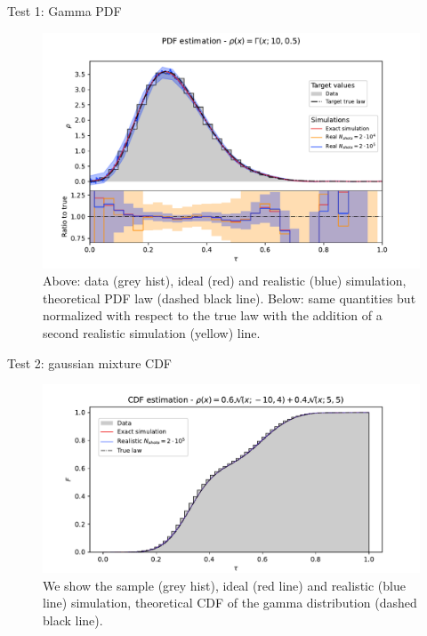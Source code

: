 \documentclass[8pt, xcolor={svgnames}, hyperref={colorlinks, linkcolor=black, citecolor=amethyst, urlcolor=amethyst}]{beamer}
\begin{document}
\begin{frame}[fragile]{Test 1: Gamma PDF}
\begin{figure}
  \centering
  \includegraphics[width=1\linewidth]{figures/PDF_Gamma_25_20_200000.pdf}
  \caption{Above: data (grey hist), ideal (red) and realistic (blue) simulation,
  theoretical PDF law (dashed black line). Below: same quantities but normalized
  with respect to the true law with the addition of a second realistic simulation
  (yellow) line.}
\end{figure}
\end{frame}

\begin{frame}[fragile]{Test 2: gaussian mixture CDF}
\begin{figure}
  \centering
  \includegraphics[width=1\linewidth]{figures/CDF_Gauss_30_20_200000.pdf}
\caption{We show the sample (grey hist), ideal (red line) and realistic 
  (blue line) simulation, theoretical CDF of the gamma distribution (dashed black
  line).}
\end{figure}
\end{frame}
\end{document}
